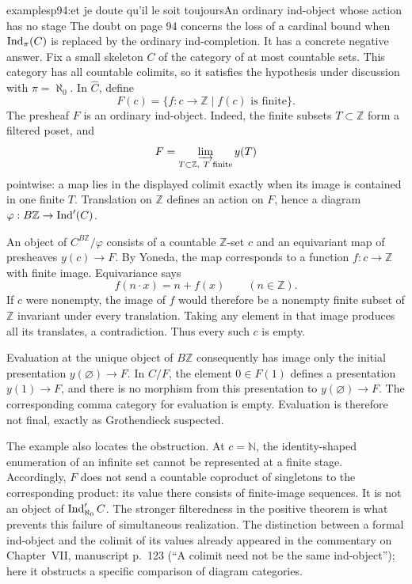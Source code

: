 \begin{dcomment}{examples}{p94:et je doute qu'il le soit toujours}{An ordinary ind-object whose action has no stage}
The doubt on page 94 concerns the loss of a cardinal bound when $\operatorname{Ind}_\pi(C)$ is replaced by the ordinary ind-completion. It has a concrete negative answer. Fix a small skeleton $C$ of the category of at most countable sets. This category has all countable colimits, so it satisfies the hypothesis under discussion with $\pi=\aleph_0$. In $\widehat C$, define
\[
F(c)=\{f:c\longrightarrow\mathbb Z\mid f(c)\text{ is finite}\}.
\]
The presheaf $F$ is an ordinary ind-object. Indeed, the finite subsets $T\subset\mathbb Z$ form a filtered poset, and
\[
F=\varinjlim_{T\subset\mathbb Z,\ T\text{ finite}}y(T)
\]
pointwise: a map lies in the displayed colimit exactly when its image is contained in one finite $T$. Translation on $\mathbb Z$ defines an action on $F$, hence a diagram $\varphi:B\mathbb Z\to\operatorname{Ind}'(C)$.

An object of $C^{B\mathbb Z}/\varphi$ consists of a countable $\mathbb Z$-set $c$ and an equivariant map of presheaves $y(c)\to F$. By Yoneda, the map corresponds to a function $f:c\to\mathbb Z$ with finite image. Equivariance says
\[
f(n\cdot x)=n+f(x)\qquad(n\in\mathbb Z).
\]
If $c$ were nonempty, the image of $f$ would therefore be a nonempty finite subset of $\mathbb Z$ invariant under every translation. Taking any element in that image produces all its translates, a contradiction. Thus every such $c$ is empty.

Evaluation at the unique object of $B\mathbb Z$ consequently has image only the initial presentation $y(\varnothing)\to F$. In $C/F$, the element $0\in F(1)$ defines a presentation $y(1)\to F$, and there is no morphism from this presentation to $y(\varnothing)\to F$. The corresponding comma category for evaluation is empty. Evaluation is therefore not final, exactly as Grothendieck suspected.

The example also locates the obstruction. At $c=\mathbb N$, the identity-shaped enumeration of an infinite set cannot be represented at a finite stage. Accordingly, $F$ does not send a countable coproduct of singletons to the corresponding product: its value there consists of finite-image sequences. It is not an object of $\operatorname{Ind}'_{\aleph_0}C$. The stronger filteredness in the positive theorem is what prevents this failure of simultaneous realization. The distinction between a formal ind-object and the colimit of its values already appeared in the commentary on Chapter~VII, manuscript p.~123 (``A colimit need not be the same ind-object''); here it obstructs a specific comparison of diagram categories.
\end{dcomment}


